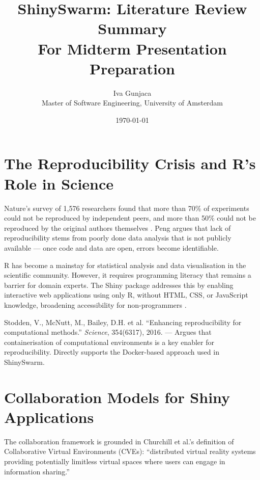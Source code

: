 \documentclass[12pt,a4paper]{article}
\title{\textbf{ShinySwarm: Literature Review Summary}\\[0.5em]
\large For Midterm Presentation Preparation}
\author{Iva Gunjaca\\
Master of Software Engineering, University of Amsterdam}
\date{\today}
\begin{document}
\maketitle
\tableofcontents
\newpage

\section{The Reproducibility Crisis and R's Role in Science}

Nature's survey of 1,576 researchers found that more than 70\% of experiments could not be reproduced by independent peers, and more than 50\% could not be reproduced by the original authors themselves \cite{baker2016}. Peng \cite{peng2011} argues that lack of reproducibility stems from poorly done data analysis that is not publicly available --- once code and data are open, errors become identifiable.

R \cite{rcore2025} has become a mainstay for statistical analysis and data visualisation in the scientific community. However, it requires programming literacy that remains a barrier for domain experts. The Shiny package \cite{chang2022} addresses this by enabling interactive web applications using only R, without HTML, CSS, or JavaScript knowledge, broadening accessibility for non-programmers \cite{hartgerink2017}.

\begin{addedsource}
Stodden, V., McNutt, M., Bailey, D.H. et al. ``Enhancing reproducibility for computational methods.'' \textit{Science}, 354(6317), 2016. --- Argues that containerisation of computational environments is a key enabler for reproducibility. Directly supports the Docker-based approach used in ShinySwarm.
\end{addedsource}

\section{Collaboration Models for Shiny Applications}

The collaboration framework is grounded in Churchill et al.'s \cite{churchill2001} definition of Collaborative Virtual Environments (CVEs): ``distributed virtual reality systems providing potentially limitless virtual spaces where users can engage in information sharing.''
\end{document}
